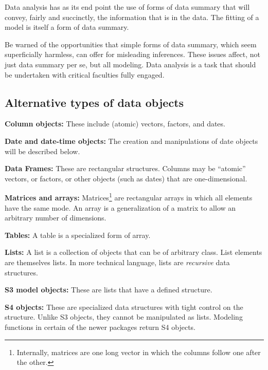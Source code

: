 



Data analysis has as its end point the use of forms of data summary
that will convey, fairly and succinctly, the information that is in
the data.  The fitting of a model is itself a form of data summary.

Be warned of
the opportunities that simple forms of data summary, which seem
superficially harmless, can offer for misleading inferences.  These
issues affect, not just data summary per se, but all modeling.  Data
analysis is a task that should be undertaken with critical
faculties fully engaged.

\subsection*{Alternative types of data objects}

\begin{trivlist}
\item[{\bf Column objects:}] These include (atomic) vectors,
factors, and dates.
\item[{\bf Date and date-time objects:}] The creation and
manipulations of date objects will be described below.
\item[{\bf Data Frames:}] These are rectangular structures.
    Columns may be ``atomic'' vectors, or
  factors, or other objects (such as dates) that are one-dimensional.
\item[{\bf Matrices and arrays:}] Matrices\footnote{Internally,
    matrices are one long vector in which the columns follow one after
    the other.} are rectangular arrays in which all elements have the
  same mode.  An array is a generalization of a matrix to allow
an arbitrary number of dimensions.
\item[{\bf Tables:}]  A table is a specialized form of array.
\item[{\bf Lists:}] A list is a collection of objects that can be of
  arbitrary class. List elements are themselves lists.  In
    more technical language, lists are {\em recursive} data structures.
\item[{\bf S3 model objects:}] These are lists that have a defined
  structure.
\item[{\bf S4 objects:}] These are specialized data structures with
  tight control on the structure. Unlike S3 objects, they cannot be
  manipulated as lists.  Modeling functions in certain of the newer
  packages return S4 objects.
\end{trivlist}

